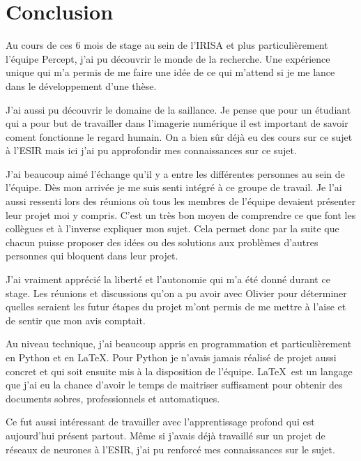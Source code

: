 \chapter{Conclusion}
\par
Au cours de ces 6 mois de stage au sein de l'IRISA et plus particulièrement l'équipe Percept, j'ai pu découvrir le monde de la recherche. Une expérience unique qui m'a permis de me faire une idée de ce qui m'attend si je me lance dans le développement d'une thèse.
\par
J'ai aussi pu découvrir le domaine de la saillance. Je pense que pour un étudiant qui a pour but de travailler dans l'imagerie numérique il est important de savoir coment fonctionne le regard humain. On a bien sûr déjà eu des cours sur ce sujet à l'ESIR mais ici j'ai pu approfondir mes connaissances sur ce sujet.
\par
J'ai beaucoup aimé l'échange qu'il y a entre les différentes personnes au sein de l'équipe. Dès mon arrivée je me suis senti intégré à ce groupe de travail. Je l'ai aussi ressenti lors des réunions où tous les membres de l'équipe devaient présenter leur projet moi y compris. C'est un très bon moyen de comprendre ce que font les collègues et à l'inverse expliquer mon sujet. Cela permet donc par la suite que chacun puisse proposer des idées ou des solutions aux problèmes d'autres personnes qui bloquent dans leur projet.
\par
J'ai vraiment apprécié la liberté et l'autonomie qui m'a été donné durant ce stage. Les réunions et discussions qu'on a pu avoir avec Olivier pour déterminer quelles seraient les futur étapes du projet m'ont permis de me mettre à l'aise et de sentir que mon avis comptait.
\par
Au niveau technique, j'ai beaucoup appris en programmation et particulièrement en Python et en \LaTeX. Pour Python je n'avais jamais réalisé de projet aussi concret et qui soit ensuite mis à la disposition de l'équipe. \LaTeX\ est un langage que j'ai eu la chance d'avoir le temps de maitriser suffisament pour obtenir des documents sobres, professionnels et automatiques.
\par
Ce fut aussi intéressant de travailler avec l'apprentissage profond qui est aujourd'hui présent partout. Même si j'avais déjà travaillé sur un projet de réseaux de neurones à l'ESIR, j'ai pu renforcé mes connaissances sur le sujet.